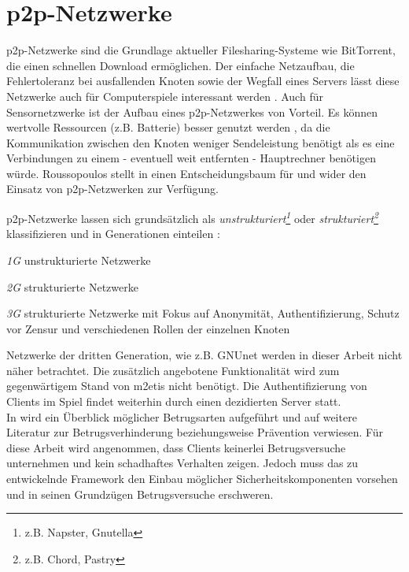 \section{p2p-Netzwerke}
\label{chap:grundlagen:p2p}

p2p-Netzwerke sind die Grundlage aktueller Filesharing-Systeme wie BitTorrent, die einen schnellen Download ermöglichen. Der einfache Netzaufbau, die Fehlertoleranz bei ausfallenden Knoten sowie der Wegfall eines Servers lässt diese Netzwerke auch für Computerspiele interessant werden \cite{Knutsson2004Peertopeer, Triebel2008Peertopeer}. Auch für Sensornetzwerke ist der Aufbau eines p2p-Netzwerkes von Vorteil. Es können wertvolle Ressourcen (z.B. Batterie) besser genutzt werden \cite{MuneebAliandKoenLangendoen2007Case, Sioutas2009Building}, da die Kommunikation zwischen den Knoten weniger Sendeleistung benötigt als es eine Verbindungen zu einem - eventuell weit entfernten - Hauptrechner benötigen würde. Roussopoulos stellt in \cite{Roussopoulos20032} einen Entscheidungsbaum für und wider den Einsatz von p2p-Netzwerken zur Verfügung.

p2p-Netzwerke lassen sich grundsätzlich als \emph{unstrukturiert\footnote{z.B. Napster, Gnutella}} oder \emph{strukturiert\footnote{z.B. Chord, Pastry}} klassifizieren \cite{Steinmetz2005, Lua2005Survey} und in Generationen einteilen \cite{Bo2003PeertoPeer}:
\begin{itemize*}
	\item \emph{1G} unstrukturierte Netzwerke
	\item \emph{2G} strukturierte Netzwerke
	\item \emph{3G} strukturierte Netzwerke mit Fokus auf Anonymität, Authentifizierung, Schutz vor Zensur und verschiedenen Rollen der einzelnen Knoten
\end{itemize*}

Netzwerke der dritten Generation, wie z.B. GNUnet \cite{Bennett2002GNet} werden in dieser Arbeit nicht näher betrachtet. Die zusätzlich angebotene Funktionalität wird zum gegenwärtigem Stand von \ac{m2etis} nicht benötigt. Die Authentifizierung von Clients im Spiel findet weiterhin durch einen dezidierten Server statt.\\
In  wird ein Überblick möglicher Betrugsarten aufgeführt und auf weitere Literatur zur Betrugsverhinderung beziehungsweise Prävention verwiesen. Für diese Arbeit wird angenommen, dass Clients keinerlei Betrugsversuche unternehmen und kein schadhaftes Verhalten zeigen. Jedoch muss das zu entwickelnde Framework den Einbau möglicher Sicherheitskomponenten vorsehen und in seinen Grundzügen Betrugsversuche erschweren.

